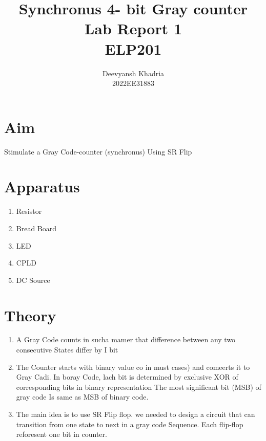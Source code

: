 \documentclass[12pt]{article}
\begin{document}
\title{Synchronus 4- bit Gray counter  \\ Lab Report 1 \\ ELP201}
\author{Deevyansh Khadria\\ 2022EE31883 }
\maketitle

\vspace{15px}
\tableofcontents






\newpage
\section{Aim}
    Stimulate a Gray Code-counter (synchronus) Using SR Flip 
\section{Apparatus}
    \begin{enumerate}
        \item Resistor
        \item Bread Board
        \item LED
        \item CPLD
        \item DC Source
    \end{enumerate}
\section{Theory}
    \begin{enumerate}
        \item A Gray Code counts in sucha mamer that difference between any two consecutive States differ by I bit
        \item The Counter starts with binary value co in must cases) and comeerts it to Gray Cadi. In boray Code, lach bit is determined by exclusive XOR of corresponding bits in binary representation The most significant bit (MSB) of gray code Is same as MSB of binary code.
        \item The main idea is to use SR Flip flop. we needed to design a circuit that can transition from one state to next in a gray code Sequence. Each flip-flop reforesent one bit in counter.
    \end{enumerate}
\end{document}
